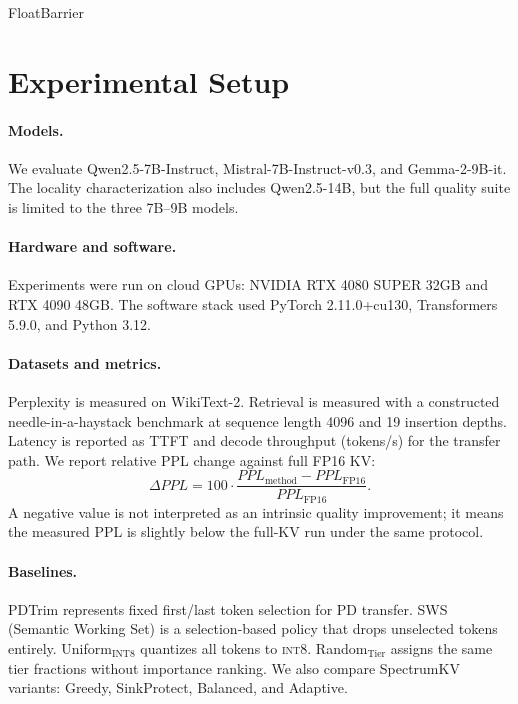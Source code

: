 \documentclass[11pt]{article}
\newcommand{\method}{SpectrumKV}
\newcommand{\ppl}{PPL}
\newcommand{\intviii}{\textsc{int8}}
\theoremstyle{plain}
\theoremstyle{definition}
\begin{document}
FloatBarrier
\section{Experimental Setup}
\label{sec:setup}

\paragraph{Models.}
We evaluate Qwen2.5-7B-Instruct, Mistral-7B-Instruct-v0.3, and Gemma-2-9B-it.  The locality characterization also includes Qwen2.5-14B, but the full quality suite is limited to the three 7B--9B models.

\paragraph{Hardware and software.}
Experiments were run on cloud GPUs: NVIDIA RTX 4080 SUPER 32GB and RTX 4090 48GB.  The software stack used PyTorch 2.11.0+cu130, Transformers 5.9.0, and Python 3.12.

\paragraph{Datasets and metrics.}
Perplexity is measured on WikiText-2.  Retrieval is measured with a constructed needle-in-a-haystack benchmark at sequence length 4096 and 19 insertion depths.  Latency is reported as TTFT and decode throughput (tokens/s) for the transfer path.  We report relative PPL change against full FP16 KV:
\begin{equation}
  \Delta \ppl = 100\cdot\frac{\ppl_{\mathrm{method}}-\ppl_{\mathrm{FP16}}}{\ppl_{\mathrm{FP16}}}.
\end{equation}
A negative value is not interpreted as an intrinsic quality improvement; it means the measured PPL is slightly below the full-KV run under the same protocol.

\paragraph{Baselines.}
PDTrim represents fixed first/last token selection for PD transfer.  SWS (Semantic Working Set) is a selection-based policy that drops unselected tokens entirely.  Uniform$_{\text{INT8}}$ quantizes all tokens to \intviii{}.  Random$_{\text{Tier}}$ assigns the same tier fractions without importance ranking.  We also compare \method{} variants: Greedy, SinkProtect, Balanced, and Adaptive.
\end{document}
